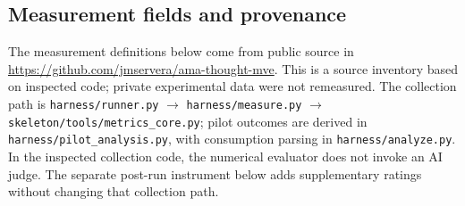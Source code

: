 \subsection{Measurement fields and provenance}\label{app:measurementprovenance}

The measurement definitions below come from public source 
in \url{https://github.com/jmservera/ama-thought-mve}. This is a source
inventory based on inspected code; private experimental data were not
remeasured. The collection path is
\nolinkurl{harness/runner.py} $\rightarrow$
\nolinkurl{harness/measure.py} $\rightarrow$
\nolinkurl{skeleton/tools/metrics_core.py}; pilot outcomes are derived in
\nolinkurl{harness/pilot_analysis.py}, with consumption parsing in
\nolinkurl{harness/analyze.py}.
In the inspected collection code, the numerical evaluator does not invoke an AI
judge. The separate post-run instrument below adds supplementary ratings
without changing that collection path.

